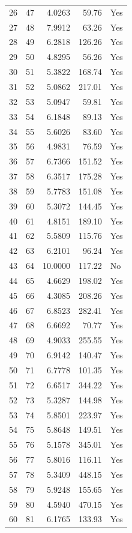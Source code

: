 \documentclass[11pt]{article}
\begin{document}
\begin{longtable}{rrrrl}
26 & 47 & 4.0263 & 59.76 & Yes \\
27 & 48 & 7.9912 & 63.26 & Yes \\
28 & 49 & 6.2818 & 126.26 & Yes \\
29 & 50 & 4.8295 & 56.26 & Yes \\
30 & 51 & 5.3822 & 168.74 & Yes \\
31 & 52 & 5.0862 & 217.01 & Yes \\
32 & 53 & 5.0947 & 59.81 & Yes \\
33 & 54 & 6.1848 & 89.13 & Yes \\
34 & 55 & 5.6026 & 83.60 & Yes \\
35 & 56 & 4.9831 & 76.59 & Yes \\
36 & 57 & 6.7366 & 151.52 & Yes \\
37 & 58 & 6.3517 & 175.28 & Yes \\
38 & 59 & 5.7783 & 151.08 & Yes \\
39 & 60 & 5.3072 & 144.45 & Yes \\
40 & 61 & 4.8151 & 189.10 & Yes \\
41 & 62 & 5.5809 & 115.76 & Yes \\
42 & 63 & 6.2101 & 96.24 & Yes \\
43 & 64 & 10.0000 & 117.22 & No \\
44 & 65 & 4.6629 & 198.02 & Yes \\
45 & 66 & 4.3085 & 208.26 & Yes \\
46 & 67 & 6.8523 & 282.41 & Yes \\
47 & 68 & 6.6692 & 70.77 & Yes \\
48 & 69 & 4.9033 & 255.55 & Yes \\
49 & 70 & 6.9142 & 140.47 & Yes \\
50 & 71 & 6.7778 & 101.35 & Yes \\
51 & 72 & 6.6517 & 344.22 & Yes \\
52 & 73 & 5.3287 & 144.98 & Yes \\
53 & 74 & 5.8501 & 223.97 & Yes \\
54 & 75 & 5.8648 & 149.51 & Yes \\
55 & 76 & 5.1578 & 345.01 & Yes \\
56 & 77 & 5.8016 & 116.11 & Yes \\
57 & 78 & 5.3409 & 448.15 & Yes \\
58 & 79 & 5.9248 & 155.65 & Yes \\
59 & 80 & 4.5940 & 470.15 & Yes \\
60 & 81 & 6.1765 & 133.93 & Yes \\

\end{longtable}
\end{document}
